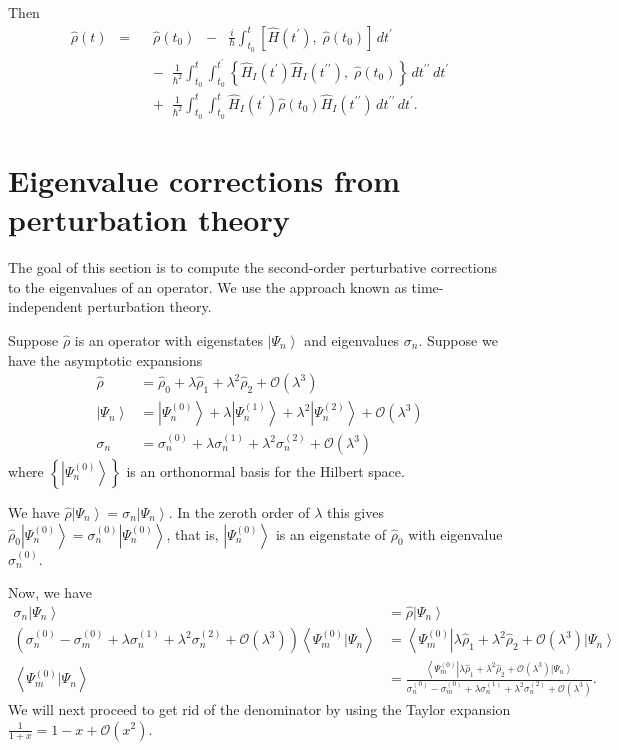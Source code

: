 \documentclass[11pt]{article}
\newcommand{\Od}[1]{\mathcal{O}{\left(#1\right)}}
\newcommand{\bra}[1]{\left\langle#1\right|}
\newcommand{\ket}[1]{\left|#1\right\rangle}
\newcommand{\braket}[2]{\left\langle#1|#2\right\rangle}
\newcommand{\op}[1]{\hat{#1}}
\theoremstyle{theorem}
\theoremstyle{remark}
\theoremstyle{step}
\theoremstyle{gap}
\begin{document}
Then
\begin{align}
\label{eq.rhoevol}
\op{\rho}(t) \;\;=\;\;& \op{\rho}\left(t_0\right)
\;\;-\;\; \frac{i}{\hbar} \int_{t_0}^t \left[\op{H}(t^\prime),\; \op{\rho}(t_0) \right] \,dt^\prime \\
& -\;\; \frac{1}{\hbar^2} \int_{t_0}^t \int_{t_0}^{t^\prime} \left\{ \op{H}_I (t^\prime) \op{H}_I(t^{\prime\prime}),\; \op{\rho}(t_0) \right\}\,dt^{\prime\prime}\,dt^\prime \nonumber\\
&+\;\; \frac{1}{\hbar^2} \int_{t_0}^t \int_{t_0}^{t} \op{H}_I (t^\prime) \op{\rho}(t_0) \op{H}_I (t^{\prime\prime})\,dt^{\prime\prime}\,dt^\prime \nonumber.
\end{align}

\section{Eigenvalue corrections from perturbation theory}

The goal of this section is to compute the second-order perturbative corrections to the eigenvalues of an operator. We use the approach known as time-independent perturbation theory.

Suppose \(\op{\rho}\) is an operator with eigenstates \(\ket{\Psi_n}\) and eigenvalues \(\sigma_n\). Suppose we have the asymptotic expansions
\begin{align*}
\op{\rho} &= \op{\rho}_0 + \lambda \op{\rho}_1 + \lambda^2 \op{\rho}_2 + \Od{\lambda^3} \\
\ket{\Psi_n} &= \ket{\Psi_n^{(0)}} + \lambda \ket{\Psi_n^{(1)}} + \lambda^2 \ket{\Psi_n^{(2)}} + \Od{\lambda^3} \\
\sigma_n &= \sigma_n^{(0)} + \lambda \sigma_n^{(1)} + \lambda^2 \sigma_n^{(2)} + \Od{\lambda^3}
\end{align*}
where \(\left\{\ket{\Psi_n^{(0)}}\right\}\) is an orthonormal basis for the Hilbert space.

We have \(\op{\rho} \ket{\Psi_n} = \sigma_n \ket{\Psi_n}\). In the zeroth order of \(\lambda\) this gives \(\op{\rho}_0 \ket{\Psi_n^{(0)}} = \sigma_n^{(0)} \ket{\Psi_n^{(0)}}\), that is, \(\ket{\Psi_n^{(0)}}\) is an eigenstate of \(\op{\rho}_0\) with eigenvalue \(\sigma_n^{(0)}\).

Now, we have
\begin{align*}
\sigma_n \ket{\Psi_n} &= \op{\rho}\ket{\Psi_n}\\
\left(\sigma_n^{(0)} - \sigma_m^{(0)} + \lambda \sigma_n^{(1)} + \lambda^2 \sigma_n^{(2)} + \Od{\lambda^3} \right)\braket{\Psi_m^{(0)}}{\Psi_n} &=\bra{\Psi_m^{(0)}} \lambda \op{\rho}_1 + \lambda^2 \op{\rho}_2 + \Od{\lambda^3} \ket{\Psi_n} \\
\braket{\Psi_m^{(0)}}{\Psi_n} &=\frac{\bra{\Psi_m^{(0)}} \lambda \op{\rho}_1 + \lambda^2 \op{\rho}_2 + \Od{\lambda^3} \ket{\Psi_n}}{\sigma_n^{(0)} - \sigma_m^{(0)} + \lambda \sigma_n^{(1)} + \lambda^2 \sigma_n^{(2)} + \Od{\lambda^3}}.
\end{align*}
We will next proceed to get rid of the denominator by using the Taylor expansion \(\frac{1}{1+x} = 1-x +\Od{x^2}\).
\end{document}
